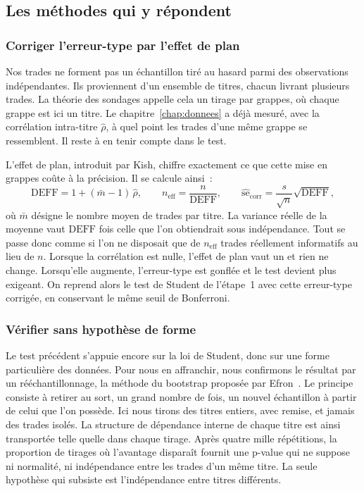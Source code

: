 \subsection{Les méthodes qui y répondent}

\subsubsection*{Corriger l'erreur-type par l'effet de plan}

Nos trades ne forment pas un échantillon tiré au hasard parmi des
observations indépendantes. Ils proviennent d'un ensemble de titres,
chacun livrant plusieurs trades. La théorie des sondages appelle cela un
tirage par grappes, où chaque grappe est ici un titre. Le
chapitre~\ref{chap:donnees} a déjà mesuré, avec la corrélation
intra-titre $\hat\rho$, à quel point les trades d'une même grappe se
ressemblent. Il reste à en tenir compte dans le test.

L'effet de plan, introduit par Kish, chiffre exactement ce que cette
mise en grappes coûte à la précision. Il se calcule ainsi~:
\[
  \mathrm{DEFF} = 1 + (\bar m - 1)\,\hat\rho,
  \qquad n_{\mathrm{eff}} = \frac{n}{\mathrm{DEFF}},
  \qquad \widehat{\mathrm{se}}_{\mathrm{corr}}
        = \frac{s}{\sqrt{n}}\sqrt{\mathrm{DEFF}},
\]
où $\bar m$ désigne le nombre moyen de trades par titre. La variance
réelle de la moyenne vaut $\mathrm{DEFF}$ fois celle que l'on
obtiendrait sous indépendance. Tout se passe donc comme si l'on ne
disposait que de $n_{\mathrm{eff}}$ trades réellement informatifs au
lieu de $n$. Lorsque la corrélation est nulle, l'effet de plan vaut un
et rien ne change. Lorsqu'elle augmente, l'erreur-type est gonflée et le
test devient plus exigeant. On reprend alors le test de Student de
l'étape~1 avec cette erreur-type corrigée, en conservant le même seuil
de Bonferroni.

\subsubsection*{Vérifier sans hypothèse de forme}

Le test précédent s'appuie encore sur la loi de Student, donc sur une
forme particulière des données. Pour nous en affranchir, nous confirmons
le résultat par un rééchantillonnage, la méthode du bootstrap proposée
par Efron~\cite{efron1979}. Le principe consiste à retirer au sort, un
grand nombre de fois, un nouvel échantillon à partir de celui que l'on
possède. Ici nous tirons des titres entiers, avec remise, et jamais des
trades isolés. La structure de dépendance interne de chaque titre est
ainsi transportée telle quelle dans chaque tirage. Après quatre mille
répétitions, la proportion de tirages où l'avantage disparaît fournit
une p-value qui ne suppose ni normalité, ni indépendance entre les
trades d'un même titre. La seule hypothèse qui subsiste est
l'indépendance entre titres différents.

